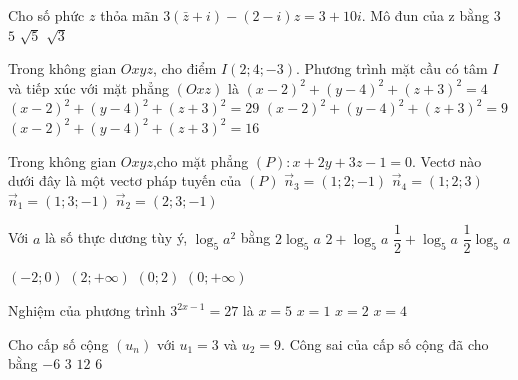 \begin{ex}%
Cho số phức $z$ thỏa mãn $3(\bar{z}+i)-(2-i) z=3+10 i$. Mô đun của z bằng
\choice
{$3$}
{$5$}
{\True $\sqrt{5}$}
{$\sqrt{3}$}

\end{ex}
\begin{ex}%
Trong không gian $O x y z$, cho điểm $I(2; 4;-3)$. Phương trình mặt cầu có tâm $I$ và tiếp xúc với mặt phẳng $(O x z)$ là
\choice
{$(x-2)^2+(y-4)^2+(z+3)^2=4$}
{$(x-2)^2+(y-4)^2+(z+3)^2=29$}
{$(x-2)^2+(y-4)^2+(z+3)^2=9$}
{\True $(x-2)^2+(y-4)^2+(z+3)^2=16$}

\end{ex}
\begin{ex}%
Trong không gian $O x y z$,cho mặt phẳng $(P)\colon x+2 y+3 z-1=0$. Vectơ nào dưới đây là một vectơ pháp tuyến của $(P)$ 
\choice
{$\vec{n}_3=(1; 2;-1)$}
{\True $\vec{n}_4=(1; 2; 3)$}
{$\vec{n}_1=(1; 3;-1)$}
{$\vec{n}_2=(2; 3;-1)$}

\end{ex}
\begin{ex}%
Với $a$ là số thực dương tùy ý, $\log_5 a^2$ bằng
\choice
{\True $2\log_5 a$}
{$2+\log_5 a$}
{$\dfrac{1}{2}+\log_5 a$}
{$\dfrac{1}{2} \log_5 a$}

\end{ex}
\begin{ex}%
{\vspace{-0.5cm}
}
\choice
{$(-2; 0)$}
{$(2;+\infty)$}
{\True $(0; 2)$}
{$(0;+\infty)$}
\end{ex}
\begin{ex}%
Nghiệm của phương trình $3^{2 x-1}=27$ là
\choice
{$x=5$}
{$x=1$}
{\True $x=2$}
{$x=4$}

\end{ex}
\begin{ex}%
Cho cấp số cộng $\left(u_n\right)$ với $u_1=3$ và $u_2=9$. Công sai của cấp số cộng đã cho bằng
\choice
{$-6$}
{$3$}
{$12$}
{\True $6$}

\end{ex}
